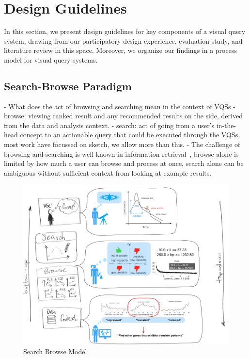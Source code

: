 \section{Design Guidelines\label{sec:guidelines}}
In this section, we present design guidelines for key components of a visual query system, drawing from our participatory design experience, evaluation study, and literature review in this space. Moreover, we organize our findings in a process model for visual query systems. %
\subsection{Search-Browse Paradigm}
- What does the act of browsing and searching mean in the context of VQSs
  - browse: viewing ranked result and any recommended results on the side, derived from the data and analysis context.
  - search: act of going from a user's in-the-head concept to an actionable query that could be executed through the VQSs, most work have focussed on sketch, we allow more than this.
  - The challenge of browsing and searching is well-known in information retrieval~\cite{Olston2003}, browse alone is limited by how much a user can browse and process at once, search alone can be ambiguous without sufficient context from looking at example results.
\begin{figure}[h!]
    \centering
    \includegraphics[width=\columnwidth]{figures/search-browse-model.png}
    \vspace{-6pt}\caption{Search Browse Model}
    \label{sbmodel}
    \vspace{-5pt}
\end{figure}
